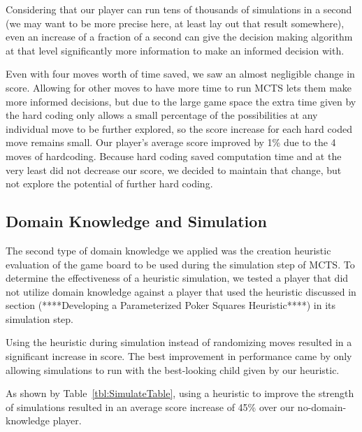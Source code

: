 \documentclass[letterpaper]{article}
\begin{document}
Considering that our player can run tens of thousands of simulations in a second (we may want to be more precise here, at least lay out that result somewhere), even an increase of a fraction of a second can give the decision making algorithm at that level significantly more information to make an informed decision with.

Even with four moves worth of time saved, we saw an almost negligible change in score. Allowing for other moves to have more time to run MCTS lets them make more informed decisions, but due to the large game space the extra time given by the hard coding only allows a small percentage of the possibilities at any individual move to be further explored, so the score increase for each hard coded move remains small. Our player’s average score improved by 1\% due to the 4 moves of hardcoding. Because hard coding saved computation time and at the very least did not decrease our score, we decided to maintain that change, but not explore the potential of further hard coding.

\subsection{Domain Knowledge and Simulation}


The second type of domain knowledge we applied was the creation heuristic evaluation of the game board to be used during the simulation step of MCTS. To determine the effectiveness of a heuristic simulation, we tested a player that did not utilize domain knowledge against a player that used the heuristic discussed in section (****Developing a Parameterized Poker Squares Heuristic****) in its simulation step. 

Using the heuristic during simulation instead of randomizing moves resulted in a significant increase in score. The best improvement in performance came by only allowing simulations to run with the best-looking child given by our heuristic. 

As shown by Table~\ref{tbl:SimulateTable}, using a heuristic to improve the strength of simulations resulted in an average score increase of 45\% over our no-domain-knowledge player.
\end{document}
